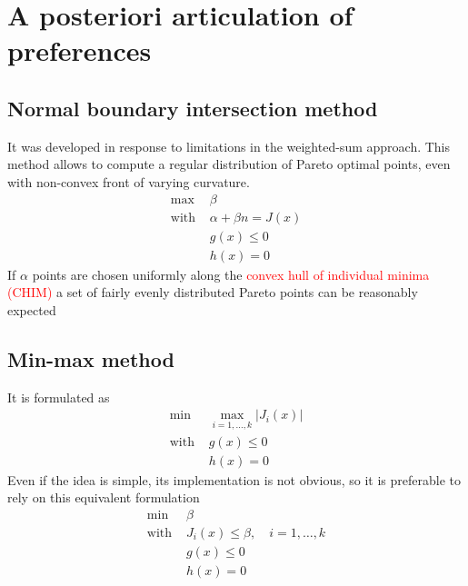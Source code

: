 \documentclass{book}
\begin{document}
\section{A posteriori articulation of preferences}
\subsection{Normal boundary intersection method}
It was developed in response to limitations in the weighted-sum approach. This method allows to compute a regular distribution of Pareto optimal points, even with non-convex front of varying curvature. 
\begin{align*}
    \max &\beta \\
    \text{with } &\alpha+\beta n = J(x)\\ 
     & g(x) \leq 0 \\ 
     & h(x) = 0
\end{align*}
If $\alpha$ points are chosen uniformly along the \textcolor{red}{convex hull of individual minima (CHIM)} a set of fairly evenly distributed Pareto points can be reasonably expected

\subsection{Min-max method}
It is formulated as 
\begin{align*}
    \min &\max_{i=1,\dots,k} |J_i(x)| \\
    \text{with }& g(x) \leq 0 \\ 
     & h(x) = 0
\end{align*}
Even if the idea is simple, its implementation is not obvious, so it is preferable to rely on this equivalent formulation
\begin{align*}
    \min\ & \beta \\
    \text{with } & J_i(x)\leq \beta, \quad i=1,\dots,k\\
     & g(x) \leq 0 \\ 
     & h(x) = 0
\end{align*}
\end{document}
